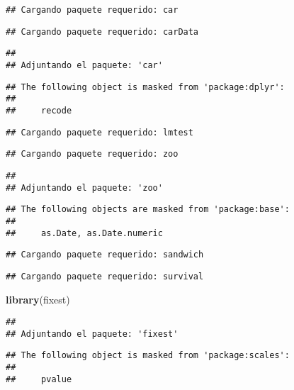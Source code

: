\documentclass[
]{article}
\newenvironment{Shaded}{\begin{snugshade}}{\end{snugshade}}
\newcommand{\FunctionTok}[1]{\textcolor[rgb]{0.13,0.29,0.53}{\textbf{#1}}}
\newcommand{\NormalTok}[1]{#1}
\begin{document}
\begin{verbatim}
## Cargando paquete requerido: car
\end{verbatim}

\begin{verbatim}
## Cargando paquete requerido: carData
\end{verbatim}

\begin{verbatim}
## 
## Adjuntando el paquete: 'car'
\end{verbatim}

\begin{verbatim}
## The following object is masked from 'package:dplyr':
## 
##     recode
\end{verbatim}

\begin{verbatim}
## Cargando paquete requerido: lmtest
\end{verbatim}

\begin{verbatim}
## Cargando paquete requerido: zoo
\end{verbatim}

\begin{verbatim}
## 
## Adjuntando el paquete: 'zoo'
\end{verbatim}

\begin{verbatim}
## The following objects are masked from 'package:base':
## 
##     as.Date, as.Date.numeric
\end{verbatim}

\begin{verbatim}
## Cargando paquete requerido: sandwich
\end{verbatim}

\begin{verbatim}
## Cargando paquete requerido: survival
\end{verbatim}

\begin{Shaded}
\begin{Highlighting}[]
\FunctionTok{library}\NormalTok{(fixest)}
\end{Highlighting}
\end{Shaded}

\begin{verbatim}
## 
## Adjuntando el paquete: 'fixest'
\end{verbatim}

\begin{verbatim}
## The following object is masked from 'package:scales':
## 
##     pvalue
\end{verbatim}
\end{document}
